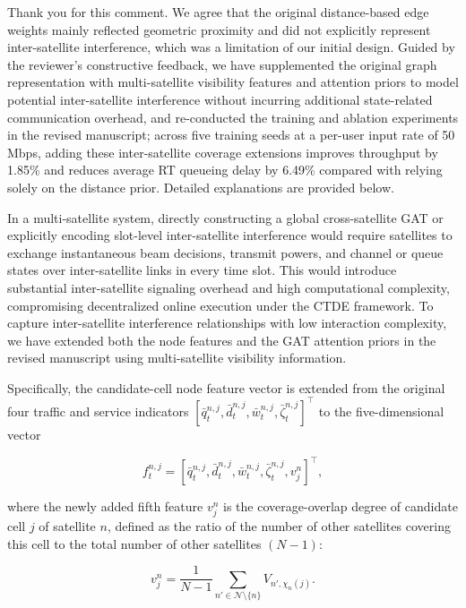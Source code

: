 \documentclass[11pt,a4paper]{article}
\begin{document}
Thank you for this comment. We agree that the original distance-based edge weights mainly reflected geometric proximity and did not explicitly represent inter-satellite interference, which was a limitation of our initial design. Guided by the reviewer's constructive feedback, we have supplemented the original graph representation with multi-satellite visibility features and attention priors to model potential inter-satellite interference without incurring additional state-related communication overhead, and re-conducted the training and ablation experiments in the revised manuscript; across five training seeds at a per-user input rate of 50 Mbps, adding these inter-satellite coverage extensions improves throughput by 1.85\% and reduces average RT queueing delay by 6.49\% compared with relying solely on the distance prior. Detailed explanations are provided below.
\par

In a multi-satellite system, directly constructing a global cross-satellite GAT or explicitly encoding slot-level inter-satellite interference would require satellites to exchange instantaneous beam decisions, transmit powers, and channel or queue states over inter-satellite links in every time slot. This would introduce substantial inter-satellite signaling overhead and high computational complexity, compromising decentralized online execution under the CTDE framework. To capture inter-satellite interference relationships with low interaction complexity, we have extended both the node features and the GAT attention priors in the revised manuscript using multi-satellite visibility information.
\par

Specifically, the candidate-cell node feature vector is extended from the original four traffic and service indicators $[\bar q_t^{n,j},\bar d_t^{n,j},\bar w_t^{n,j},\bar\zeta_t^{n,j}]^\top$ to the five-dimensional vector
\par

\[
f_t^{n,j}=[\bar q_t^{n,j},\bar d_t^{n,j},\bar w_t^{n,j},\bar\zeta_t^{n,j},v_j^n]^\top,
\]

where the newly added fifth feature $v_j^n$ is the coverage-overlap degree of candidate cell $j$ of satellite $n$, defined as the ratio of the number of other satellites covering this cell to the total number of other satellites $(N-1)$:
\par

\[
v_j^n=\frac{1}{N-1}\sum_{n'\in\mathcal N\setminus\{n\}}V_{n',\chi_n(j)}.
\]
\end{document}
